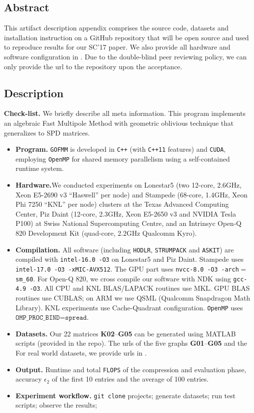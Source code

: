 \subsection{Abstract}
This artifact description appendix comprises the source code, datasets and installation
instruction on a GitHub repository that will be open source and
used to reproduce results for our SC'17 paper.
We also provide all hardware and software configuration in 
.
Due to the double-blind peer reviewing policy, we can only provide 
the url to the repository upon the acceptance.

\subsection{Description} \label{s:sup_setup}

\textbf{Check-list.} 
We briefly describe all meta information.
This program implements an algebraic Fast Multipole Method
with geometric oblivious technique that generalizes to 
SPD matrices.
\begin{itemize}[leftmargin=*]\zapspace
  \item \textbf{Program.} \texttt{GOFMM} is developed in \texttt{C++} (with
    \texttt{C++11} features)
  and \texttt{CUDA}, employing \texttt{OpenMP} 
  for shared memory parallelism using a self-contained runtime system.
\item \textbf{Hardware.}We conducted experiments on
        Lonestar5 (two 12-core, 2.6GHz, Xeon E5-2690 v3  ``Haswell''
        per node) and Stampede (68-core, 1.4GHz, Xeon Phi 7250 ``KNL'' per node)
        clusters at the Texas Advanced Computing Center,
Piz Daint (12-core, 2.3GHz, Xeon  E5-2650 v3 and NVIDIA Tesla P100)
at Swiss National Supercomputing Centre,
and an Intrinsyc Open-Q 820 Development Kit (quad-core, 2.2GHz Qualcomm Kyro).
\item \textbf{Compilation.} All software (including \texttt{HODLR}, \texttt{STRUMPACK} and \texttt{ASKIT}) 
are compiled with 
\texttt{intel-16.0 -O3}  on
Lonestar5 and Piz Daint. Stampede uses \texttt{intel-17.0 -O3 -xMIC-AVX512}.
The GPU part uses \texttt{nvcc-8.0 -O3 -arch$=$sm\_60}. 
For Open-Q 820, we cross compile our software with NDK using 
\texttt{gcc-4.9 -O3}.
All CPU and KNL BLAS/LAPACK routines use MKL.
GPU BLAS routines use CUBLAS; on ARM we use QSML
(Qualcomm Snapdragon Math Library).
KNL experiments use Cache-Quadrant configuration. 
\texttt{OpenMP} uses $\texttt{OMP\_PROC\_BIND=spread}$.
\item \textbf{Datasets.} Our 22 matrices \textbf{K02}--\textbf{G05} can be generated using 
  MATLAB scripts (provided in the repo). 
  The urls of the five graphs \textbf{G01}--\textbf{G05} and the
  For real world datasets, we provide urls in .
\item \textbf{Output.} Runtime and total \texttt{FLOPS} of the compression
  and evaluation phase, accuracy $\epsilon_2$ of the first 10 entries
  and the average of 100 entries.
\item \textbf{Experiment workflow.} \texttt{git clone} projects;
  generate datasets; run test scripts; observe the results;
\end{itemize}

